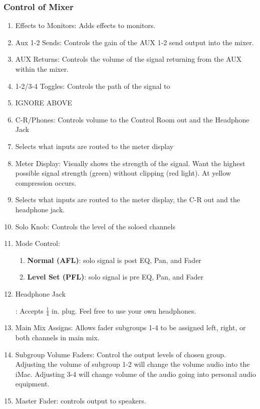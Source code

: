 \subsubsection{Control of Mixer}
\begin{multicols}{2}
\small
\begin{enumerate}
	\item Effects to Monitors: Adds effects to monitors.
	\item Aux 1-2 Sends: Controls the gain of the AUX 1-2 send output into the mixer.
	\item AUX Returns: Controls the volume of the signal returning from the AUX within the mixer.
	\item 1-2/3-4 Toggles: Controls the path of the signal to
	\item IGNORE ABOVE
	\item C-R/Phones: Controls volume to the Control Room out and the Headphone Jack
	\item Selects what inputs are routed to the meter display
	\item Meter Display: Visually shows the strength of the signal. Want the highest possible signal strength (green) without clipping (red light). At yellow compression occurs.
	\item Selects what inputs are routed to the meter display, the C-R out and the headphone jack.
	\item Solo Knob: Controls the level of the soloed channels
	\item Mode Control:
	\begin{enumerate}
		\item \textbf{Normal (AFL)}: solo signal is post EQ, Pan, and Fader
		\item \textbf{Level Set (PFL)}: solo signal is pre EQ, Pan, and Fader
	\end{enumerate}
	\item \hypertarget{Headphone Jack}{Headphone Jack}: Accepts $\frac{1}{4}$ in. plug. Feel free to use your own headphones.
	\item Main Mix Assigns: Allows fader subgroups 1-4 to be assigned left, right, or both channels in main mix.
	\item Subgroup Volume Faders: Control the output levels of chosen group. Adjusting the volume of subgroup 1-2 will change the volume audio into the iMac. Adjusting 3-4 will change volume of the audio going into personal audio equipment.
	\item Master Fader: controls output to speakers.
\end{enumerate}

\end{multicols}
